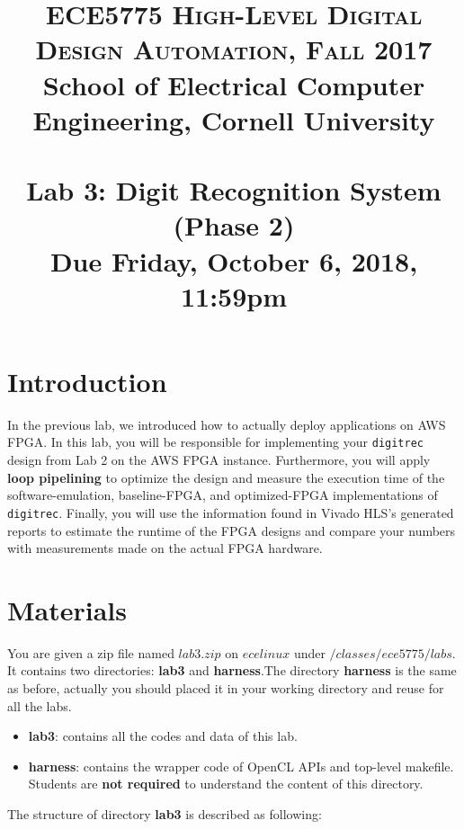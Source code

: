 \documentclass[paper=letter, fontsize=10pt]{scrartcl} %
\title{	
\normalfont \normalsize 
\textsc{ECE5775 High-Level Digital Design Automation, Fall 2017} \\  
School of Electrical Computer Engineering, Cornell University \\ [11pt]%
\horrule{0.5pt} \\[0.4cm] %
\large Lab 3: Digit Recognition System (Phase 2) \\ %
\small Due Friday, October 6, 2018, 11:59pm
\horrule{0.5pt} \\[0.5cm] %
\vspace{-15ex}}
\date{}
\numberwithin{equation}{section} %
\numberwithin{figure}{section} %
\numberwithin{table}{section} %
\begin{document}

\maketitle %

\section{Introduction}

In the previous lab, we introduced how to actually deploy applications on AWS FPGA.
In this lab, you will be responsible for implementing your \texttt{digitrec}
design from Lab 2 on the AWS FPGA instance.
Furthermore, you will apply \textbf{loop pipelining}
to optimize the design and measure the execution time of the software-emulation,
baseline-FPGA, and optimized-FPGA implementations of \texttt{digitrec}.
Finally, you will use the information found in Vivado HLS's generated reports
to estimate the runtime of the FPGA designs and compare your numbers
with measurements made on the actual FPGA hardware.

\section{Materials}
You are given a zip file named 
$lab3.zip$ on $ecelinux$ under $/classes/ece5775/labs$. It contains two directories: \textbf{lab3} and \textbf{harness}.The directory \textbf{harness} is the same as before, actually you should placed it in your working directory and reuse for all the labs.

\begin{itemize}
	\item \textbf{lab3}: contains all the codes and data of this lab.
	\item \textbf{harness}: contains the wrapper code of OpenCL APIs and top-level makefile. Students are \textbf{not required} to understand the content of this directory.
\end{itemize}

The structure of directory \textbf{lab3} is described as following:
\end{document}
